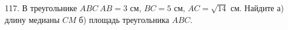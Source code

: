 117. В треугольнике $ABC\ AB=3$ см, $BC=5$ см, $AC=\sqrt{14}$ см. Найдите а) длину медианы $CM$ б) площадь треугольника $ABC.$\\
